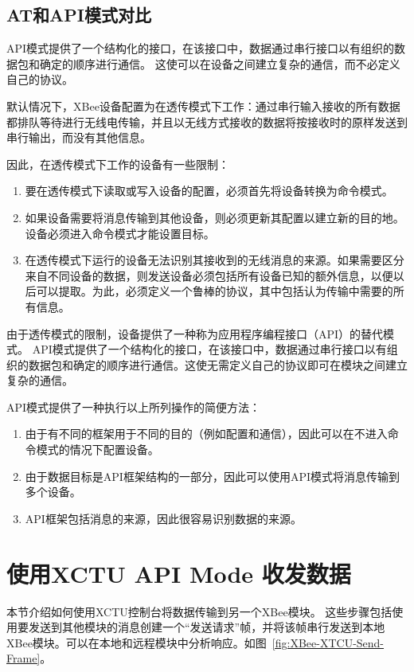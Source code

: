 \subsection{AT和API模式对比}

API模式提供了一个结构化的接口，在该接口中，数据通过串行接口以有组织的数据包和确定的顺序进行通信。 这使可以在设备之间建立复杂的通信，而不必定义自己的协议。

默认情况下，XBee设备配置为在透传模式下工作：通过串行输入接收的所有数据都排队等待进行无线电传输，并且以无线方式接收的数据将按接收时的原样发送到串行输出，而没有其他信息。

因此，在透传模式下工作的设备有一些限制：

\begin{enumerate}
    \item 要在透传模式下读取或写入设备的配置，必须首先将设备转换为命令模式。
    \item 如果设备需要将消息传输到其他设备，则必须更新其配置以建立新的目的地。设备必须进入命令模式才能设置目标。
    \item 在透传模式下运行的设备无法识别其接收到的无线消息的来源。如果需要区分来自不同设备的数据，则发送设备必须包括所有设备已知的额外信息，以便以后可以提取。为此，必须定义一个鲁棒的协议，其中包括认为传输中需要的所有信息。
\end{enumerate}
 
由于透传模式的限制，设备提供了一种称为应用程序编程接口（API）的替代模式。 API模式提供了一个结构化的接口，在该接口中，数据通过串行接口以有组织的数据包和确定的顺序进行通信。这使无需定义自己的协议即可在模块之间建立复杂的通信。


API模式提供了一种执行以上所列操作的简便方法：

\begin{enumerate}
    \item 由于有不同的框架用于不同的目的（例如配置和通信），因此可以在不进入命令模式的情况下配置设备。
    \item 由于数据目标是API框架结构的一部分，因此可以使用API模式将消息传输到多个设备。
    \item API框架包括消息的来源，因此很容易识别数据的来源。    
\end{enumerate}

\section{使用XCTU API Mode 收发数据}

本节介绍如何使用XCTU控制台将数据传输到另一个XBee模块。 这些步骤包括使用要发送到其他模块的消息创建一个“发送请求”帧，并将该帧串行发送到本地XBee模块。可以在本地和远程模块中分析响应。如图~\ref{fig:XBee-XTCU-Send-Frame}。

